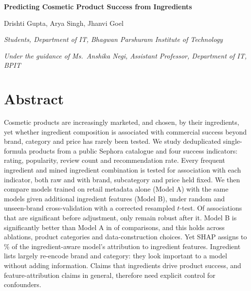 \documentclass[11pt,a4paper]{article}
\begin{document}
\begin{center}
{\LARGE\bfseries Predicting Cosmetic Product Success from Ingredients\par}
\vspace{6pt}
{\large Drishti Gupta, Arya Singh, Jhanvi Goel\par}
\vspace{1pt}
{\itshape Students, Department of IT, Bhagwan Parshuram Institute of Technology\par}
\vspace{1pt}
{\itshape Under the guidance of Ms.\ Anshika Negi, Assistant Professor, Department of IT, BPIT\par}
\end{center}

\section*{Abstract}
Cosmetic products are increasingly marketed, and chosen, by their ingredients, yet whether ingredient composition is associated with commercial success beyond brand, category and price has rarely been tested. We study \NAnalysed{} deduplicated single-formula products from a public Sephora catalogue and four success indicators: rating, popularity, review count and recommendation rate. Every frequent ingredient and mined ingredient combination is tested for association with each indicator, both raw and with brand, subcategory and price held fixed. We then compare models trained on retail metadata alone (Model A) with the same models given \NIngredientFeatures{} additional ingredient features (Model B), under random and unseen-brand cross-validation with a corrected resampled $t$-test. Of \NSigRaw{} associations that are significant before adjustment, only \NRobust{} remain robust after it. Model B is significantly better than Model A in \NBBetter{} of \NComparisons{} comparisons, and this holds across ablations, product categories and data-construction choices. Yet SHAP assigns \MinIngredientShare{} to \MaxIngredientShare{}\% of the ingredient-aware model's attribution to ingredient features. Ingredient lists largely re-encode brand and category: they look important to a model without adding information. Claims that ingredients drive product success, and feature-attribution claims in general, therefore need explicit control for confounders.
\end{document}
